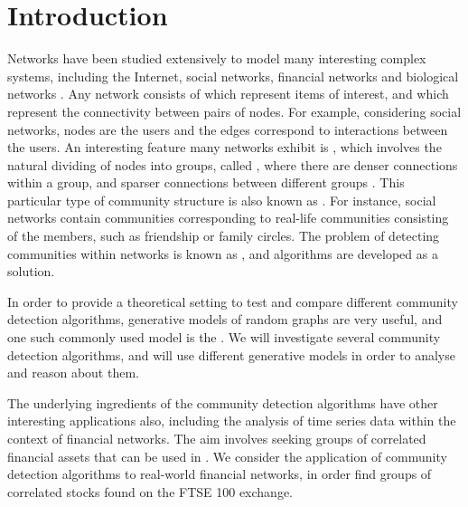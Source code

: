 
\chapter{Introduction}

\label{cha:introduction}


Networks have been studied extensively to model many interesting complex systems, including the Internet, social networks, financial networks and biological networks \cite{New06a,DKM+13,MG13}.
Any network consists of  which represent items of interest, and  which represent the connectivity between pairs of nodes. For example, considering social networks, nodes are the users and the edges correspond to interactions between the users.
An interesting feature many networks exhibit is , which involves the natural dividing of nodes into groups, called , where there are denser connections within a group, and sparser connections between different groups \cite{New06a,DKM+13,For10,New06b}. This particular type of community structure is also known as  \cite{DKM+13}. For instance, social networks contain communities corresponding to real-life communities consisting of the members, such as friendship or family circles.
The problem of detecting communities within networks is known as , and algorithms are developed as a solution.

In order to provide a theoretical setting to test and compare different community detection algorithms, generative models of random graphs are very useful, and one such commonly used model is the  \cite{DKM+13,NN12}. We will investigate several community detection algorithms, and will use different generative models in order to analyse and reason about them.

The underlying ingredients of the community detection algorithms have other interesting applications also, including the analysis of time series data within the context of financial networks. The aim involves seeking groups of correlated financial assets that can be used in .
We consider the application of community detection algorithms to real-world financial networks, in order find groups of correlated stocks found on the FTSE 100 exchange.

